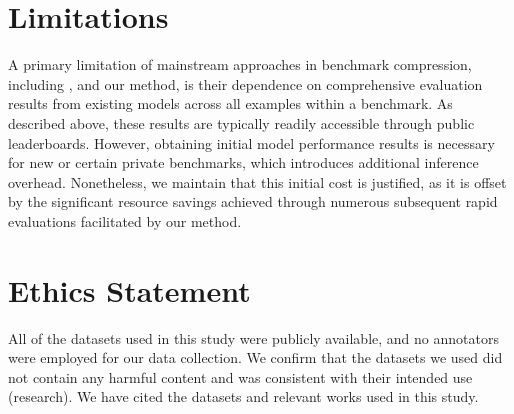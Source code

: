 \section*{Limitations} A primary limitation of mainstream approaches in benchmark compression, including \citep{AP, tiny}, and our method, is their dependence on comprehensive evaluation results from existing models across all examples within a benchmark. As described above, these results are typically readily accessible through public leaderboards. 
However, obtaining initial model performance results is necessary for new or certain private benchmarks, which introduces additional inference overhead. Nonetheless, we maintain that this initial cost is justified, as it is offset by the significant resource savings achieved through numerous subsequent rapid evaluations facilitated by our method.

\section*{Ethics Statement}
All of the datasets used in this study were publicly available, and no annotators were employed for our data collection. We confirm that the datasets we used did not contain any harmful content and was consistent with their intended use (research). We have cited the datasets and relevant works used in this study.
